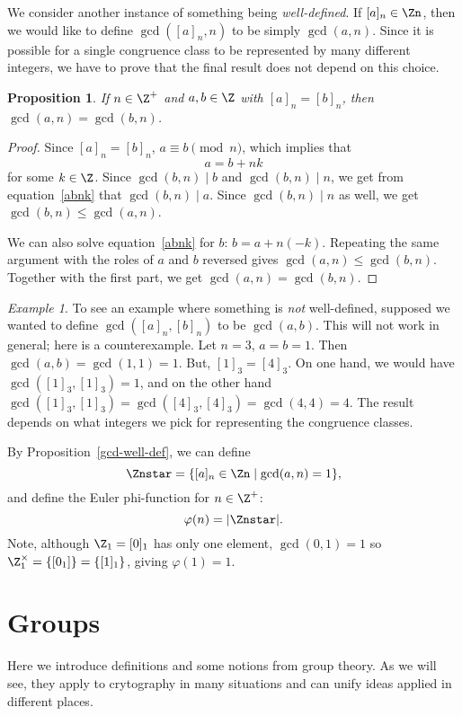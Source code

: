 \documentclass[12pt]{amsart}
\newcommand{\terminology}[1]{\textbf{\textit{#1}}}
\renewcommand{\terminology}[1]{#1}
\newcommand{\term}{\terminology}
\theoremstyle{plain}
\newtheorem{prop}[thm]{Proposition}
\theoremstyle{definition}
\theoremstyle{remark}
\newtheorem*{exam}{Example}
\begin{document}
We consider another instance of something being \emph{well-defined}.
If $[a]_n\in\Zn$, then we would like to define $\gcd([a]_n,n)$ to be
simply $\gcd(a,n)$.  Since it is possible for a single congruence
class to be represented by many different integers, we have to prove
that the final result does not depend on this choice.
\begin{prop}
  If $n\in\Z^+$ and $a,b\in\Z$ with $[a]_n=[b]_n$, then
  $\gcd(a,n)=\gcd(b,n)$.
\end{prop}
\begin{proof} \label{gcd-well-def}
  Since $[a]_n=[b]_n$, $a\equiv b\pmod n$, which implies that 
\begin{equation}\label{abnk}
  a=b+nk
\end{equation}
for some $k\in\Z$.  Since $\gcd(b,n)\mid b$ and $\gcd(b,n)\mid n$,
  we get from equation~\ref{abnk} that $\gcd(b,n)\mid a$.  Since
  $\gcd(b,n)\mid n$ as well, we get $\gcd(b,n)\leq \gcd(a,n)$.

  We can also solve equation~\ref{abnk} for $b$: $b=a+n(-k)$.
  Repeating the same argument with the roles of $a$ and $b$ reversed
  gives $\gcd(a,n)\leq \gcd(b,n)$.  Together with the first part, we
  get $\gcd(a,n)=\gcd(b,n)$.
\end{proof}
\begin{exam}
  To see an example where something is \emph{not} well-defined,
  supposed we wanted to define $\gcd([a]_n,[b]_n)$ to be $\gcd(a,b)$.
  This will not work in general; here is a counterexample.  Let $n=3$,
  $a=b=1$.  Then $\gcd(a,b)=\gcd(1,1)=1$.  But, $[1]_3=[4]_3$.  On one
  hand, we would have $\gcd([1]_3,[1]_3)=1$, and on the other hand
  $\gcd([1]_3,[1]_3) = \gcd([4]_3,[4]_3) =\gcd(4,4)=4$.  The result
  depends on what integers we pick for representing the congruence classes.
\end{exam}

By Proposition~\ref{gcd-well-def}, we can define
\[ \term{\Znstar} = \{[a]_n\in\Zn\mid \gcd(a,n)=1\},\]
and define the Euler phi-function for $n\in\Z^+$:
\[ \term{\varphi(}n) = |\Znstar|.\]
Note, although $\Z_1=[0]_1$ has only one element, $\gcd(0,1)=1$ so
$\Z_1^\times=\{[0_1]\} = \{[1]_1\}$, giving $\varphi(1)=1$.




\section{Groups}

Here we introduce definitions and some notions from group theory.  As
we will see, they apply to crytography in many situations and can
unify ideas applied in different places.
\end{document}
